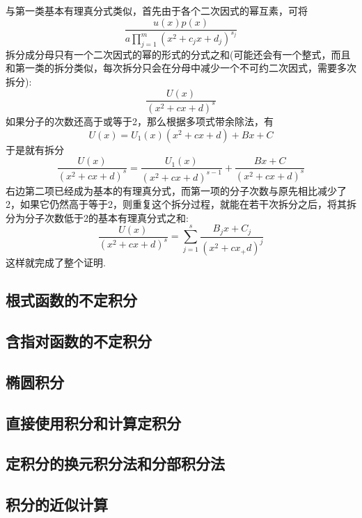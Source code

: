与第一类基本有理真分式类似，首先由于各个二次因式的幂互素，可将
\[ \frac{u(x)p(x)}{a \prod_{j=1}^m(x^2+c_j x + d_j)^{s_j}} \]
拆分成分母只有一个二次因式的幂的形式的分式之和(可能还会有一个整式，而且和第一类的拆分类似，每次拆分只会在分母中减少一个不可约二次因式，需要多次拆分):
\[ \frac{U(x)}{(x^2+cx+d)^s} \]
如果分子的次数还高于或等于2，那么根据多项式带余除法，有
\[ U(x)=U_1(x)(x^2+cx+d)+Bx+C \]
于是就有拆分
\[ \frac{U(x)}{(x^2+cx+d)^s} = \frac{U_1(x)}{(x^2+cx+d)^{s-1}} + \frac{Bx+C}{(x^2+cx+d)^s} \]
右边第二项已经成为基本的有理真分式，而第一项的分子次数与原先相比减少了2，如果它仍然高于等于2，则重复这个拆分过程，就能在若干次拆分之后，将其拆分为分子次数低于2的基本有理真分式之和:
\[ \frac{U(x)}{(x^2+cx+d)^s} = \sum_{j=1}^s \frac{B_jx+C_j}{(x^2+cx_+d)^{j}} \]
这样就完成了整个证明.




\subsection{根式函数的不定积分}
\label{sec:indefinite-integration-of-irrational-function}

\subsection{含指对函数的不定积分}
\label{sec:indefinite-integration-of-exp-log-function}

\subsection{椭圆积分}
\label{sec:elliptic-integral}

\subsection{直接使用积分和计算定积分}
\label{sec:computation-of-definite-integral-by-riemann-sum}

\subsection{定积分的换元积分法和分部积分法}
\label{sec:definite-integral-by-substitution-or-partial}

\subsection{积分的近似计算}
\label{sec:approx-computation-of-integral}





